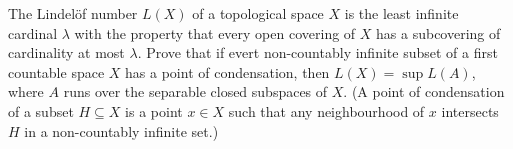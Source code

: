 The Lindelöf number $L(X)$ of a topological space $X$ is the least infinite cardinal $\lambda$ with the property that every open covering of $X$ has a subcovering of cardinality at most $\lambda$. Prove that if evert non-countably infinite subset of a first countable space $X$ has a point of condensation, then $L(X)=\sup L(A)$, where $A$ runs over the separable closed subspaces of $X$.
(A point of condensation of a subset $H\subseteq X$ is a point $x\in X$ such that any neighbourhood of $x$ intersects $H$ in a non-countably infinite set.)